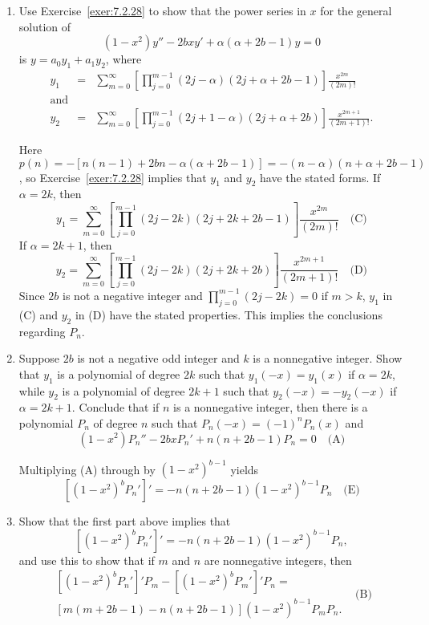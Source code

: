 \documentclass{ximera}
\begin{document}
\begin{problem}\label{exer:7.2.30}
\begin{enumerate}
\item %
Use Exercise~\ref{exer:7.2.28}  to show that the power series in $x$
for the general solution of
$$
(1-x^2)y''-2bxy'+\alpha(\alpha+2b-1)y=0
$$
is $y=a_0y_1+a_1y_2$, where
\begin{eqnarray*}
y_1&=&\sum_{m=0}^\infty \left[\prod_{j=0}^{m-1}(2j-\alpha)(2j+\alpha+2b-1)
\right]\frac{x^{2m}}{(2m)!}\\
\mbox{and}\\
y_2&=&\sum_{m=0}^\infty \left[\prod_{j=0}^{m-1}(2j+1-\alpha)(2j+\alpha+2b)
\right]\frac{x^{2m+1}}{(2m+1)!}.
\end{eqnarray*}

\begin{solution}
    Here
$p(n)=-[n(n-1)+2bn-\alpha(\alpha+2b-1)]=-(n-\alpha)(n+\alpha+2b-1)$,
so Exercise~\ref{exer:7.2.28} implies that $y_1$ and $y_2$ have the stated
forms. If $\alpha=2k$, then
$$
y_1=\sum_{m=0}^\infty \left[\prod_{j=0}^{m-1}(2j-2k)(2j+2k+2b-1)
\right]\frac{x^{2m}}{(2m)!}\quad
\text{(C)}
$$
If $\alpha=2k+1$, then
$$
y_2=\sum_{m=0}^\infty \left[\prod_{j=0}^{m-1}(2j-2k)(2j+2k+2b)
\right]\frac{x^{2m+1}}{(2m+1)!}\quad
\text{(D)}
$$
Since $2b$ is not a negative integer and $\prod_{j=0}^{m-1}(2j-2k)=0$
if $m>k$, $y_1$ in (C) and $y_2$ in (D) have the stated properties.
This implies the conclusions regarding $P_n$.
\end{solution}

\item %
Suppose $2b$ is not a negative odd integer and $k$ is a
nonnegative integer. Show that $y_1$ is a polynomial of degree $2k$
such that $y_1(-x)=y_1(x)$ if $\alpha=2k$, while $y_2$ is a polynomial
of degree $2k+1$ such that $y_2(-x)=-y_2(-x)$ if $\alpha=2k+1$.
Conclude that if $n$ is a nonnegative integer, then there is a
polynomial $P_n$ of degree $n$ such that $P_n(-x)=(-1)^nP_n(x)$ and
$$
(1-x^2)P_n''-2bxP_n'+n(n+2b-1)P_n=0\quad
\text{(A)}
$$

\begin{solution}
    Multiplying (A) through by $(1-x^2)^{b-1}$ yields
$$
[(1-x^2)^b P_n']'=-n(n+2b-1)(1-x^2)^{b-1}P_n \quad
\text{(E)}
$$
\end{solution}

\item %
Show that the first part above implies that
$$
[(1-x^2)^b P_n']'=-n(n+2b-1)(1-x^2)^{b-1}P_n,
$$
and use this to show that if $m$ and $n$ are nonnegative integers, then
$$
\begin{array}{ll}
[(1-x^2)^bP_n']'P_m-[(1-x^2)^bP_m']'P_n=&\\
\left[m(m+2b-1)-n(n+2b-1)\right](1-x^2)^{b-1}P_mP_n.&
\end{array}
\text{(B)}
$$


\end{enumerate}
\end{problem}
\end{document}
